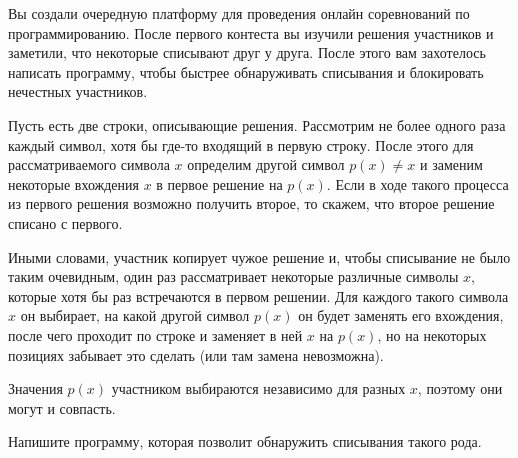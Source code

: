 Вы создали очередную платформу для проведения онлайн соревнований по программированию. После первого контеста вы изучили решения участников и заметили, что некоторые списывают друг у друга. После этого вам захотелось написать программу, чтобы быстрее обнаруживать списывания и блокировать нечестных участников. 

Пусть есть две строки, описывающие решения. Рассмотрим не более одного раза каждый символ, хотя бы где-то входящий в первую строку. После этого для рассматриваемого символа $x$ определим другой символ $p(x) \neq x$ и заменим некоторые вхождения $x$ в первое решение на $p(x)$. Если в ходе такого процесса из первого решения возможно получить второе, то скажем, что второе решение списано с первого. 

Иными словами, участник копирует чужое решение и, чтобы списывание не было таким очевидным, один раз рассматривает некоторые различные символы $x$, которые хотя бы раз встречаются в первом решении. Для каждого такого символа $x$ он выбирает, на какой другой символ $p(x)$ он будет заменять его вхождения, после чего проходит по строке и заменяет в ней $x$ на $p(x)$, но на некоторых позициях забывает это сделать (или там замена невозможна).

Значения $p(x)$ участником выбираются независимо для разных $x$, поэтому они могут и совпасть.

Напишите программу, которая позволит обнаружить списывания такого рода.
